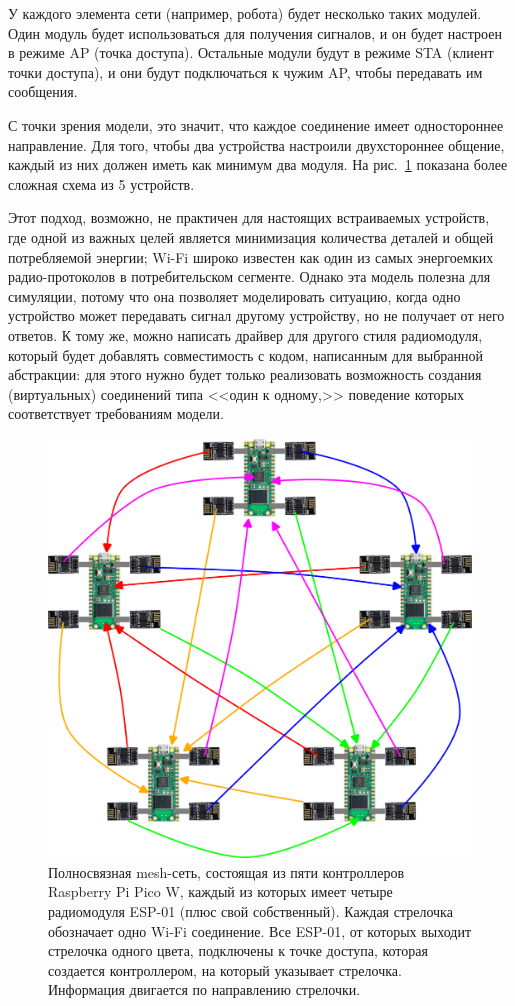 \documentclass[%
]{report}
\begin{document}
У каждого элемента сети (например, робота)
будет несколько таких модулей.
Один модуль будет использоваться для получения сигналов,
и он будет настроен в режиме AP (точка доступа).
Остальные модули будут в режиме STA (клиент точки доступа),
и они будут подключаться к чужим AP,
чтобы передавать им сообщения.

С точки зрения модели, это значит,
что каждое соединение имеет одностороннее направление.
Для того, чтобы два устройства настроили двухстороннее общение,
каждый из них должен иметь как минимум два модуля.
На рис.~\ref{fig:connections} показана более сложная схема из 5 устройств.

Этот подход, возможно, не практичен для настоящих встраиваемых устройств,
где одной из важных целей является минимизация количества деталей
и общей потребляемой энергии;
Wi-Fi широко известен как один из самых энергоемких радио-протоколов в потребительском сегменте.
Однако эта модель полезна для симуляции,
потому что она позволяет моделировать ситуацию,
когда одно устройство может передавать сигнал другому устройству,
но не получает от него ответов.
К тому же,
можно написать драйвер для другого стиля радиомодуля,
который будет добавлять совместимость с кодом,
написанным для выбранной абстракции:
для этого нужно будет только реализовать возможность создания (виртуальных)
соединений типа <<один к одному,>>
поведение которых соответствует требованиям модели.

\begin{figure}[p]
  \centering
  \includegraphics[width=\linewidth]{connections}
  \caption{Полносвязная mesh-сеть, состоящая из пяти контроллеров Raspberry Pi Pico W, каждый из которых имеет четыре радиомодуля ESP-01 (плюс свой собственный). Каждая стрелочка обозначает одно Wi-Fi соединение. Все ESP-01, от которых выходит стрелочка одного цвета, подключены к точке доступа, которая создается контроллером, на который указывает стрелочка. Информация двигается по направлению стрелочки.}
  \label{fig:connections}
\end{figure}
\end{document}
